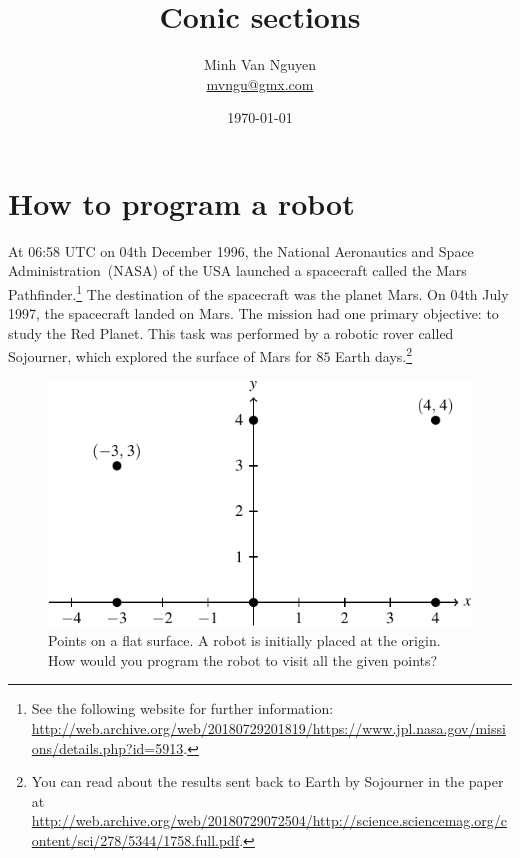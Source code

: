 \documentclass[a4paper,oneside,12pt]{article}
\begin{document}
\title{\Large\bf Conic sections}
\author{%
  Minh Van Nguyen \\
  \url{mvngu@gmx.com}
}
\date{\today}
\maketitle



\section{How to program a robot}

At 06:58 UTC on 04th December 1996, the National Aeronautics and Space
Administration~(NASA) of the USA launched a spacecraft called the Mars
Pathfinder.\footnote{
  See the following website for further information:
  \url{http://web.archive.org/web/20180729201819/https://www.jpl.nasa.gov/missions/details.php?id=5913}.
}
The destination of the spacecraft was the planet Mars.  On 04th July
1997, the spacecraft landed on Mars.  The mission had one primary
objective: to study the Red Planet.  This task was performed by a
robotic rover called Sojourner, which explored the surface of Mars for
$85$ Earth days.\footnote{
  You can read about the results sent back to Earth by Sojourner in
  the paper at
  \url{http://web.archive.org/web/20180729072504/http://science.sciencemag.org/content/sci/278/5344/1758.full.pdf}.
}

\begin{figure}[!htbp]
\centering
\includegraphics[scale=1.1]{image/14/robot-path-points.pdf}
\caption{%
  Points on a flat surface.  A robot is initially placed at the
  origin.  How would you program the robot to visit all the given
  points?
}
\label{fig:conic:robot_points}
\end{figure}
\end{document}

